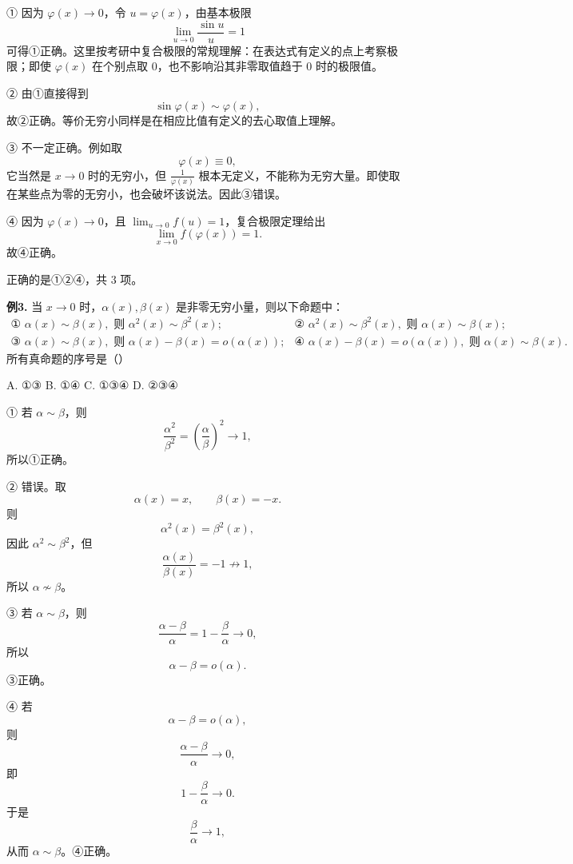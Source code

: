 \begin{solutionblock}

① 因为 \(\varphi(x)\to0\)，令 \(u=\varphi(x)\)，由基本极限
\[
\lim_{u\to0}\frac{\sin u}{u}=1
\]
可得①正确。这里按考研中复合极限的常规理解：在表达式有定义的点上考察极限；即使 \(\varphi(x)\) 在个别点取 \(0\)，也不影响沿其非零取值趋于 \(0\) 时的极限值。

② 由①直接得到
\[
\sin\varphi(x)\sim\varphi(x),
\]
故②正确。等价无穷小同样是在相应比值有定义的去心取值上理解。

③ 不一定正确。例如取
\[
\varphi(x)\equiv0,
\]
它当然是 \(x\to0\) 时的无穷小，但 \(\frac1{\varphi(x)}\) 根本无定义，不能称为无穷大量。即使取在某些点为零的无穷小，也会破坏该说法。因此③错误。

④ 因为 \(\varphi(x)\to0\)，且 \(\lim_{u\to0}f(u)=1\)，复合极限定理给出
\[
\lim_{x\to0}f(\varphi(x))=1.
\]
故④正确。

正确的是①②④，共 3 项。

\end{solutionblock}

\begin{problemblock}
\textbf{例3.} 当 \(x\to0\) 时，\(\alpha(x),\beta(x)\) 是非零无穷小量，则以下命题中：
\[
\begin{array}{ll}
\text{① }\alpha(x)\sim\beta(x),\text{ 则 }\alpha^2(x)\sim\beta^2(x);&
\text{② }\alpha^2(x)\sim\beta^2(x),\text{ 则 }\alpha(x)\sim\beta(x);\\
\text{③ }\alpha(x)\sim\beta(x),\text{ 则 }\alpha(x)-\beta(x)=o(\alpha(x));&
\text{④ }\alpha(x)-\beta(x)=o(\alpha(x)),\text{ 则 }\alpha(x)\sim\beta(x).
\end{array}
\]
所有真命题的序号是（\quad）

A. ①③ \qquad B. ①④ \qquad C. ①③④ \qquad D. ②③④
\end{problemblock}

\begin{solutionblock}

① 若 \(\alpha\sim\beta\)，则
\[
\frac{\alpha^2}{\beta^2}=\left(\frac{\alpha}{\beta}\right)^2\to1,
\]
所以①正确。

② 错误。取
\[
\alpha(x)=x,\qquad \beta(x)=-x.
\]
则
\[
\alpha^2(x)=\beta^2(x),
\]
因此 \(\alpha^2\sim\beta^2\)，但
\[
\frac{\alpha(x)}{\beta(x)}=-1\not\to1,
\]
所以 \(\alpha\not\sim\beta\)。

③ 若 \(\alpha\sim\beta\)，则
\[
\frac{\alpha-\beta}{\alpha}=1-\frac{\beta}{\alpha}\to0,
\]
所以
\[
\alpha-\beta=o(\alpha).
\]
③正确。

④ 若
\[
\alpha-\beta=o(\alpha),
\]
则
\[
\frac{\alpha-\beta}{\alpha}\to0,
\]
即
\[
1-\frac{\beta}{\alpha}\to0.
\]
于是
\[
\frac{\beta}{\alpha}\to1,
\]
从而 \(\alpha\sim\beta\)。④正确。

\end{solutionblock}

